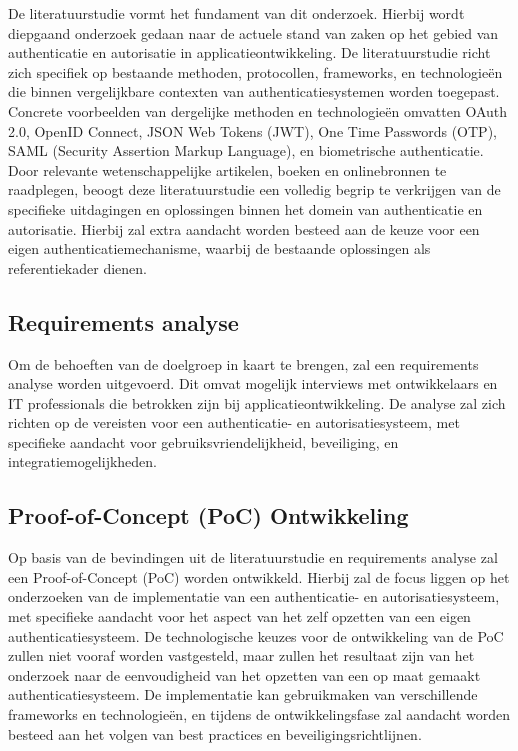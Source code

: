 De literatuurstudie vormt het fundament van dit onderzoek. Hierbij wordt diepgaand onderzoek gedaan naar de actuele stand van zaken op het gebied 
van authenticatie en autorisatie in applicatieontwikkeling. De literatuurstudie richt zich specifiek op bestaande methoden, protocollen, frameworks, 
en technologieën die binnen vergelijkbare contexten van authenticatiesystemen worden toegepast. Concrete voorbeelden van dergelijke methoden en 
technologieën omvatten OAuth 2.0, OpenID Connect, JSON Web Tokens (JWT), One Time Passwords (OTP), SAML (Security Assertion Markup Language), en 
biometrische authenticatie. 
Door relevante wetenschappelijke artikelen, boeken en onlinebronnen te raadplegen, beoogt deze literatuurstudie een volledig begrip te verkrijgen 
van de specifieke uitdagingen en oplossingen binnen het domein van authenticatie en autorisatie. Hierbij zal extra aandacht worden besteed aan de 
keuze voor een eigen authenticatiemechanisme, waarbij de bestaande oplossingen als referentiekader dienen.

\subsection{Requirements analyse}

Om de behoeften van de doelgroep in kaart te brengen, zal een requirements analyse worden uitgevoerd. Dit omvat mogelijk interviews met ontwikkelaars 
en IT professionals die betrokken zijn bij applicatieontwikkeling. De analyse zal zich richten op de vereisten voor een authenticatie- en 
autorisatiesysteem, met specifieke aandacht voor gebruiksvriendelijkheid, beveiliging, en integratiemogelijkheden.

\subsection{Proof-of-Concept (PoC) Ontwikkeling}

Op basis van de bevindingen uit de literatuurstudie en requirements analyse zal een Proof-of-Concept (PoC) worden ontwikkeld. Hierbij zal de focus 
liggen op het onderzoeken van de implementatie van een authenticatie- en autorisatiesysteem, met specifieke aandacht voor het aspect van 
het zelf opzetten van een eigen authenticatiesysteem.
De technologische keuzes voor de ontwikkeling van de PoC zullen niet vooraf worden vastgesteld, maar zullen het resultaat zijn van het onderzoek 
naar de eenvoudigheid van het opzetten van een op maat gemaakt authenticatiesysteem. De implementatie kan gebruikmaken van verschillende frameworks 
en technologieën, en tijdens de ontwikkelingsfase zal aandacht worden besteed aan het volgen van best practices en beveiligingsrichtlijnen.

